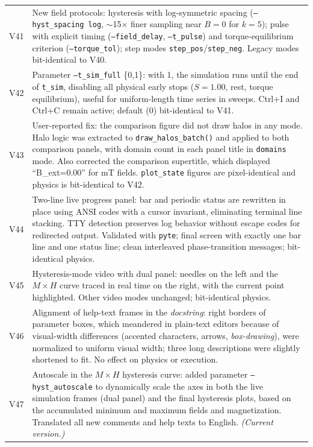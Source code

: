 \documentclass[11pt,a4paper]{article}
\newcommand{\code}[1]{\texttt{#1}}
\begin{document}
\begin{longtable}{@{}lp{11.5cm}@{}}
V41 & New field protocols: hysteresis with log-symmetric spacing (\code{--hyst\_spacing log}, $\sim$15$\times$ finer sampling near $B{=}0$ for $k{=}5$); pulse with explicit timing (\code{--field\_delay}, \code{--t\_pulse}) and torque-equilibrium criterion (\code{--torque\_tol}); step modes \code{step\_pos}/\code{step\_neg}. Legacy modes bit-identical to V40. \\
V42 & Parameter \code{--t\_sim\_full} \{0,1\}: with 1, the simulation runs until the end of \code{t\_sim}, disabling all physical early stops ($S{=}1.00$, rest, torque equilibrium), useful for uniform-length time series in sweeps. Ctrl+I and Ctrl+C remain active; default (0) bit-identical to V41. \\
V43 & User-reported fix: the comparison figure did not draw halos in any mode. Halo logic was extracted to \code{draw\_halos\_batch()} and applied to both comparison panels, with domain count in each panel title in \code{domains} mode. Also corrected the comparison supertitle, which displayed ``B\_ext=0.00'' for mT fields. \code{plot\_state} figures are pixel-identical and physics is bit-identical to V42. \\
V44 & Two-line live progress panel: bar and periodic status are rewritten in place using ANSI codes with a cursor invariant, eliminating terminal line stacking. TTY detection preserves log behavior without escape codes for redirected output. Validated with \code{pyte}; final screen with exactly one bar line and one status line; clean interleaved phase-transition messages; bit-identical physics. \\
V45 & Hysteresis-mode video with dual panel: needles on the left and the $M\times H$ curve traced in real time on the right, with the current point highlighted. Other video modes unchanged; bit-identical physics. \\
V46 & Alignment of help-text frames in the \emph{docstring}: right borders of parameter boxes, which meandered in plain-text editors because of visual-width differences (accented characters, arrows, \emph{box-drawing}), were normalized to uniform visual width; three long descriptions were slightly shortened to fit. No effect on physics or execution. \\
V47 & Autoscale in the $M\times H$ hysteresis curve: added parameter \code{--hyst\_autoscale} to dynamically scale the axes in both the live simulation frames (dual panel) and the final hysteresis plots, based on the accumulated minimum and maximum fields and magnetization. Translated all new comments and help texts to English. \emph{(Current version.)} \\

\end{longtable}
\end{document}
